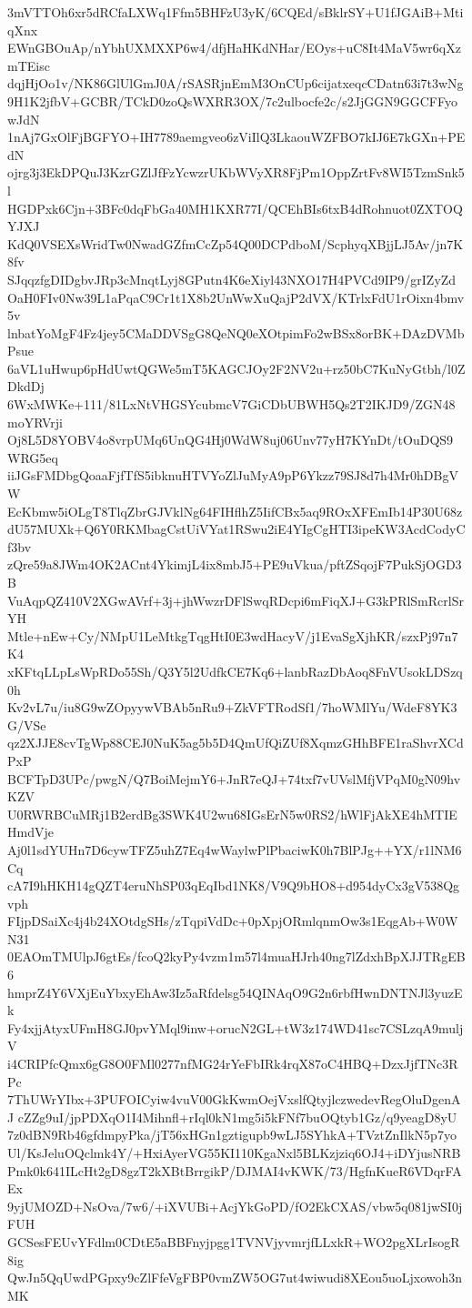 3mVTTOh6xr5dRCfaLXWq1Ffm5BHFzU3yK/6CQEd/sBklrSY+U1fJGAiB+MtiqXnx
EWnGBOuAp/nYbhUXMXXP6w4/dfjHaHKdNHar/EOys+uC8It4MaV5wr6qXzmTEisc
dqjHjOo1v/NK86GlUlGmJ0A/rSASRjnEmM3OnCUp6cijatxeqcCDatn63i7t3wNg
9H1K2jfbV+GCBR/TCkD0zoQsWXRR3OX/7c2ulbocfe2c/s2JjGGN9GGCFFyowJdN
1nAj7GxOlFjBGFYO+IH7789aemgveo6zViIlQ3LkaouWZFBO7kIJ6E7kGXn+PEdN
ojrg3j3EkDPQuJ3KzrGZlJfFzYcwzrUKbWVyXR8FjPm1OppZrtFv8WI5TzmSnk5l
HGDPxk6Cjn+3BFc0dqFbGa40MH1KXR77I/QCEhBIs6txB4dRohnuot0ZXTOQYJXJ
KdQ0VSEXsWridTw0NwadGZfmCcZp54Q00DCPdboM/ScphyqXBjjLJ5Av/jn7K8fv
SJqqzfgDIDgbvJRp3cMnqtLyj8GPutn4K6eXiyl43NXO17H4PVCd9IP9/grIZyZd
OaH0FIv0Nw39L1aPqaC9Cr1t1X8b2UnWwXuQajP2dVX/KTrlxFdU1rOixn4bmv5v
lnbatYoMgF4Fz4jey5CMaDDVSgG8QeNQ0eXOtpimFo2wBSx8orBK+DAzDVMbPsue
6aVL1uHwup6pHdUwtQGWe5mT5KAGCJOy2F2NV2u+rz50bC7KuNyGtbh/l0ZDkdDj
6WxMWKe+111/81LxNtVHGSYcubmcV7GiCDbUBWH5Qs2T2IKJD9/ZGN48moYRVrji
Oj8L5D8YOBV4o8vrpUMq6UnQG4Hj0WdW8uj06Unv77yH7KYnDt/tOuDQS9WRG5eq
iiJGsFMDbgQoaaFjfTfS5ibknuHTVYoZlJuMyA9pP6Ykzz79SJ8d7h4Mr0hDBgVW
EcKbmw5iOLgT8TlqZbrGJVklNg64FIHflhZ5IifCBx5aq9ROxXFEmIb14P30U68z
dU57MUXk+Q6Y0RKMbagCstUiVYat1RSwu2iE4YIgCgHTI3ipeKW3AcdCodyCf3bv
zQre59a8JWm4OK2ACnt4YkimjL4ix8mbJ5+PE9uVkua/pftZSqojF7PukSjOGD3B
VuAqpQZ410V2XGwAVrf+3j+jhWwzrDFlSwqRDcpi6mFiqXJ+G3kPRlSmRcrlSrYH
Mtle+nEw+Cy/NMpU1LeMtkgTqgHtI0E3wdHacyV/j1EvaSgXjhKR/szxPj97n7K4
xKFtqLLpLsWpRDo55Sh/Q3Y5l2UdfkCE7Kq6+lanbRazDbAoq8FnVUsokLDSzq0h
Kv2vL7u/iu8G9wZOpyywVBAb5nRu9+ZkVFTRodSf1/7hoWMlYu/WdeF8YK3G/VSe
qz2XJJE8cvTgWp88CEJ0NuK5ag5b5D4QmUfQiZUf8XqmzGHhBFE1raShvrXCdPxP
BCFTpD3UPc/pwgN/Q7BoiMejmY6+JnR7eQJ+74txf7vUVslMfjVPqM0gN09hvKZV
U0RWRBCuMRj1B2erdBg3SWK4U2wu68IGsErN5w0RS2/hWlFjAkXE4hMTIEHmdVje
Aj0l1sdYUHn7D6cywTFZ5uhZ7Eq4wWaylwPlPbaciwK0h7BlPJg++YX/r1lNM6Cq
cA7I9hHKH14gQZT4eruNhSP03qEqIbd1NK8/V9Q9bHO8+d954dyCx3gV538Qgvph
FIjpDSaiXc4j4b24XOtdgSHs/zTqpiVdDc+0pXpjORmlqnmOw3s1EqgAb+W0WN31
0EAOmTMUlpJ6gtEs/fcoQ2kyPy4vzm1m57l4muaHJrh40ng7lZdxhBpXJJTRgEB6
hmprZ4Y6VXjEuYbxyEhAw3Iz5aRfdelsg54QINAqO9G2n6rbfHwnDNTNJl3yuzEk
Fy4xjjAtyxUFmH8GJ0pvYMql9inw+orucN2GL+tW3z174WD41sc7CSLzqA9muljV
i4CRIPfcQmx6gG8O0FMl0277nfMG24rYeFbIRk4rqX87oC4HBQ+DzxJjfTNc3RPc
7ThUWrYIbx+3PUFOICyiw4vuV00GkKwmOejVxslfQtyjlczwedevRegOluDgenAJ
cZZg9uI/jpPDXqO1I4Mihnfl+rIql0kN1mg5i5kFNf7buOQtyb1Gz/q9yeagD8yU
7z0dBN9Rb46gfdmpyPka/jT56xHGn1gztigupb9wLJ5SYhkA+TVztZnIlkN5p7yo
Ul/KsJeluOQclmk4Y/+HxiAyerVG55KI110KgaNxl5BLKzjziq6OJ4+iDYjusNRB
Pmk0k641ILcHt2gD8gzT2kXBtBrrgikP/DJMAI4vKWK/73/HgfnKueR6VDqrFAEx
9yjUMOZD+NsOva/7w6/+iXVUBi+AcjYkGoPD/fO2EkCXAS/vbw5q081jwSI0jFUH
GCSesFEUvYFdlm0CDtE5aBBFnyjpgg1TVNVjyvmrjfLLxkR+WO2pgXLrIsogR8ig
QwJn5QqUwdPGpxy9cZlFfeVgFBP0vmZW5OG7ut4wiwudi8XEou5uoLjxowoh3nMK
